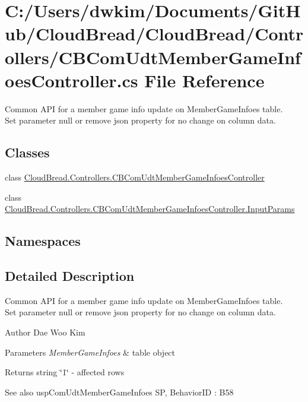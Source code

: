 \hypertarget{a00210}{}\section{C\+:/\+Users/dwkim/\+Documents/\+Git\+Hub/\+Cloud\+Bread/\+Cloud\+Bread/\+Controllers/\+C\+B\+Com\+Udt\+Member\+Game\+Infoes\+Controller.cs File Reference}
\label{a00210}


Common A\+PI for a member game info update on Member\+Game\+Infoes table. ~\newline
Set parameter null or remove json property for no change on column data.  


\subsection*{Classes}
\begin{DoxyCompactItemize}
\item 
class \hyperlink{a00037}{Cloud\+Bread.\+Controllers.\+C\+B\+Com\+Udt\+Member\+Game\+Infoes\+Controller}
\item 
class \hyperlink{a00099}{Cloud\+Bread.\+Controllers.\+C\+B\+Com\+Udt\+Member\+Game\+Infoes\+Controller.\+Input\+Params}
\end{DoxyCompactItemize}
\subsection*{Namespaces}
\begin{DoxyCompactItemize}
\end{DoxyCompactItemize}


\subsection{Detailed Description}
Common A\+PI for a member game info update on Member\+Game\+Infoes table. ~\newline
Set parameter null or remove json property for no change on column data. 

\begin{DoxyAuthor}{Author}
Dae Woo Kim 
\end{DoxyAuthor}

\begin{DoxyParams}{Parameters}
{\em Member\+Game\+Infoes} & table object \\
\hline
\end{DoxyParams}
\begin{DoxyReturn}{Returns}
string \char`\"{}1\char`\"{} -\/ affected rows 
\end{DoxyReturn}
\begin{DoxySeeAlso}{See also}
usp\+Com\+Udt\+Member\+Game\+Infoes SP, Behavior\+ID \+: B58 
\end{DoxySeeAlso}
